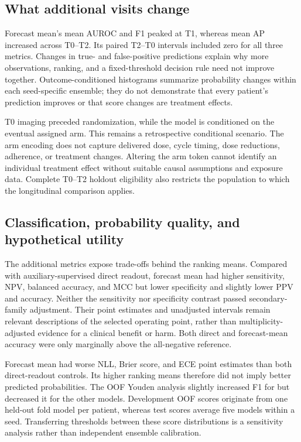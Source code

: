\subsection{What additional visits change}
Forecast mean's mean AUROC and F1 peaked at T1, whereas mean AP increased across T0--T2. Its paired T2--T0 intervals included zero for all three metrics. Changes in true- and false-positive predictions explain why more observations, ranking, and a fixed-threshold decision rule need not improve together. Outcome-conditioned histograms summarize probability changes within each seed-specific ensemble; they do not demonstrate that every patient's prediction improves or that score changes are treatment effects.

T0 imaging preceded randomization, while the model is conditioned on the eventual assigned arm. This remains a retrospective conditional scenario. The arm encoding does not capture delivered dose, cycle timing, dose reductions, adherence, or treatment changes. Altering the arm token cannot identify an individual treatment effect without suitable causal assumptions and exposure data. Complete T0--T2 holdout eligibility also restricts the population to which the longitudinal comparison applies.

\subsection{Classification, probability quality, and hypothetical utility}
The additional metrics expose trade-offs behind the ranking means. Compared with auxiliary-supervised direct readout, forecast mean had higher sensitivity, NPV, balanced accuracy, and MCC but lower specificity and slightly lower PPV and accuracy. Neither the sensitivity nor specificity contrast passed secondary-family adjustment. Their point estimates and unadjusted intervals remain relevant descriptions of the selected operating point, rather than multiplicity-adjusted evidence for a clinical benefit or harm. Both direct and forecast-mean accuracy were only marginally above the all-negative reference.

Forecast mean had worse NLL, Brier score, and ECE point estimates than both direct-readout controls. Its higher ranking means therefore did not imply better predicted probabilities. The OOF Youden analysis slightly increased F1 for \nojepa{} but decreased it for the other models. Development OOF scores originate from one held-out fold model per patient, whereas test scores average five models within a seed. Transferring thresholds between these score distributions is a sensitivity analysis rather than independent ensemble calibration.

